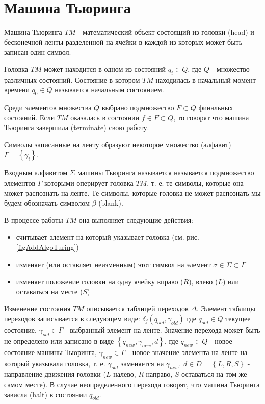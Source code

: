 \section{Машина Тьюринга}
\label{addTuring}

Машина Тьюринга $TM$ - математический объект состоящий из
головки (head) и бесконечной ленты разделенной на ячейки в каждой из
которых может быть записан один символ.



Головка $TM$ может находится в одном из состояний $q_i \in Q$, где $Q$
- множество различных состояний. Состояние в котором $TM$ находилась в
начальный момент времени $q_0 \in Q$ называется начальным состоянием. 

Среди элементов множества $Q$ выбрано подмножество $F \subset Q$
финальных состояний. Если $TM$ оказалась в состоянии $f \in F \subset
Q$, то говорят что машина Тьюринга завершила (terminate) свою работу.

Символы записанные на ленту образуют некоторое множество (алфавит)
$\Gamma = \left\{\gamma_i\right\}$.

Входным алфавитом $\Sigma$ машины Тьюринга называется называется
подмножество элементов $\Gamma$ которыми оперирует головка $TM$,
т. е. те символы, которые она может распознать на ленте. Те символы,
которые головка не может распознать мы будем обозначать символом
$\beta$ (blank).

В процессе работы $TM$ она выполняет следующие действия:
\begin{itemize}
\item{считывает элемент на который указывает головка
  (см. рис. \ref{figAddAlgoTuring})}
\item{изменяет (или оставляет неизменным) этот символ на элемент
  $\sigma \in \Sigma \subset \Gamma$}
\item{изменяет положение головки на одну ячейку вправо ($R$), влево
($L$) или оставаться на месте ($S$)}
\end{itemize}

Изменение состояния $TM$ описывается таблицей переходов
$\Delta$. Элемент таблицы переходов записывается в следующем виде: 
$\delta_j\left(q_{old}, \gamma_{old}\right)$ где $q_{old} \in Q$ текущее состояние,
$\gamma_{old} \in \Gamma$ - выбранный элемент на ленте. Значение
перехода может быть 
не определено или записано в виде $\left\{q_{new}, \gamma_{new}, d\right\}$, где
$q_{new} \in Q$ - новое состояние машины Тьюринга, $\gamma_{new} \in \Gamma$ -
новое значение элемента на ленте на который указывала головка,
т. е. $\gamma_{old}$ заменяется на $\gamma_{new}$. $d \in D =
\left\{L, R, S\right\}$ - направление
движения головки ($L$ налево, $R$ направо, $S$ оставаться на том же
самом месте). В случае неопределенного
перехода говорят, что машина Тьюринга зависла (halt) в состоянии $q_{old}$.



